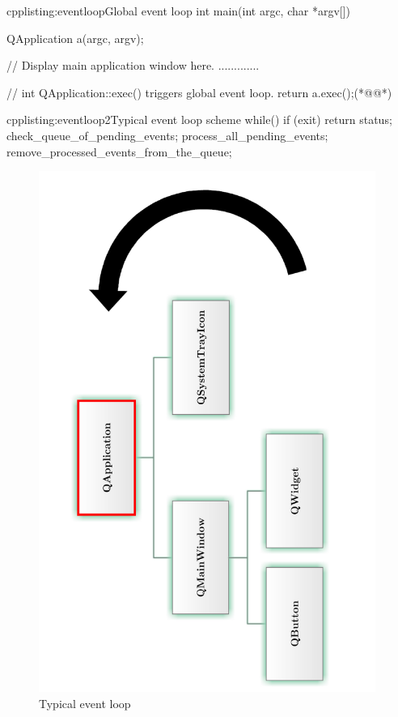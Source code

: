 \begin{fdoccode}{cpp}{listing:eventloop}{Global event loop}
int main(int argc, char *argv[]) {
    QApplication a(argc, argv);
    
    // Display main application window here.
    .............

	// int QApplication::exec() triggers global event loop.
    return a.exec();(*@\label{listing:loop1}@*)
}
\end{fdoccode}

\begin{fdoccode}{cpp}{listing:eventloop2}{Typical event loop scheme}
while() {
	if (exit) {
		return status;
	}
	check_queue_of_pending_events;
	process_all_pending_events;
	remove_processed_events_from_the_queue;
}
\end{fdoccode}

\begin{figure}[ht]
\centering
\includegraphics[angle=-90,width=11cm]{graphics/laboratory/15-eventloop.pdf}
\caption{Typical event loop}\label{figure:eventloop}
\end{figure}

